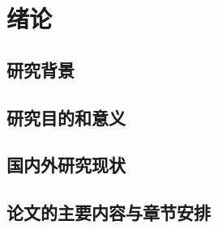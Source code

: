 

\chapter{绪论}
\label{chapter:Introduction}

\section{研究背景}

\section{研究目的和意义}

\section{国内外研究现状}

\section{论文的主要内容与章节安排}
